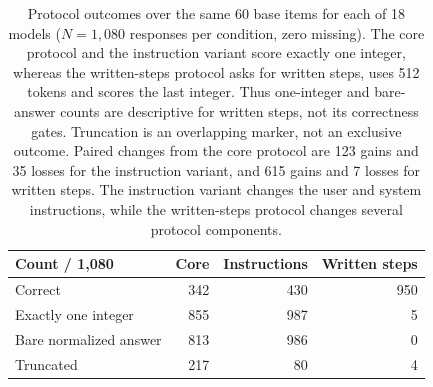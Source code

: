 \begin{table}[t]
\centering
\small
\setlength{\tabcolsep}{4pt}
\begin{tabular}{lrrr}
\toprule
Count / 1,080 & Core & Instructions & Written steps \\
\midrule
Correct & 342 & 430 & 950 \\
Exactly one integer & 855 & 987 & 5 \\
Bare normalized answer & 813 & 986 & 0 \\
Truncated & 217 & 80 & 4 \\
\bottomrule
\end{tabular}
\caption{Protocol outcomes over the same 60 base items for each of 18 models ($N=1,080$ responses per condition, zero missing). The core protocol and the instruction variant score exactly one integer, whereas the written-steps protocol asks for written steps, uses 512 tokens and scores the last integer. Thus one-integer and bare-answer counts are descriptive for written steps, not its correctness gates. Truncation is an overlapping marker, not an exclusive outcome. Paired changes from the core protocol are 123 gains and 35 losses for the instruction variant, and 615 gains and 7 losses for written steps. The instruction variant changes the user and system instructions, while the written-steps protocol changes several protocol components.}
\label{tab:protocol}
\end{table}
